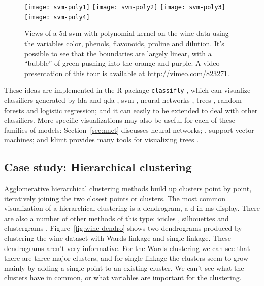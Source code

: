 \documentclass[preprint]{imsart}
\begin{document}
\begin{figure}[htbp]
  \centering
    \texttt{[image: svm-poly1]}
    \texttt{[image: svm-poly2]}
    \texttt{[image: svm-poly3]}
    \texttt{[image: svm-poly4]}
  \caption{Views of a 5d {\sc svm} with polynomial kernel on the wine data using the variables color, phenols, flavonoids, proline and dilution.  It's possible to see that the boundaries are largely linear, with a ``bubble'' of green pushing into the orange and purple.  A video presentation of this tour is available at \url{http://vimeo.com/823271}.}
  \label{fig:svm-poly5}
\end{figure}

These ideas are implemented in the R package {\tt classifly} \citep{classifly}, which can visualize classifiers generated by {\sc lda} and {\sc qda} \citep{mass}, {\sc svm} \citep{e1071}, neural networks \citep{mass}, trees \citep{rpart}, random forests \citep{randomForest} and logistic regression; and it can easily to be extended to deal with other classifiers.  More specific visualizations may also be useful for each of these families of models: Section~\ref{sec:nnet} discusses neural networks; \citet{cook:2007}, support vector machines; and {\sc klimt} provides many tools for visualizing trees \citep{urbanek:2002,urbanek:2002a,urbanek:2003}.

\subsection{Case study: Hierarchical clustering}
\label{sub:hierarchical}

Agglomerative hierarchical clustering methods \citep{hartigan:1975a} build up clusters point by point, iteratively joining the two closest points or clusters. The most common visualization of a hierarchical clustering is a dendrogram, a d-in-ms display. There are also a number of other methods of this type: icicles \citep{kruskal:1983}, silhouettes \citep{trauwaert:1989} and clustergrams \citep{schonlau:2002}. Figure~\ref{fig:wine-dendro} shows two dendrograms produced by clustering the wine dataset with Wards linkage and single linkage. These dendrograms aren't very informative. For the Wards clustering we can see that there are three major clusters, and for single linkage the clusters seem to grow mainly by adding a single point to an existing cluster. We can't see what the clusters have in common, or what variables are important for the clustering.

\end{document}
